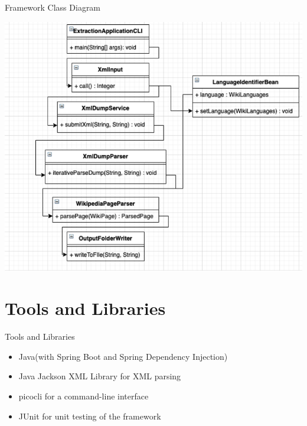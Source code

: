 \documentclass[czech,aspectratio=169]{beamer}
\begin{document}
	\begin{frame}{Framework Class Diagram}
		\begin{center}
			\includegraphics[width=0.55\paperwidth]{framework_diagram.png}
		\end{center}
	\end{frame}

    \section{Tools and Libraries}
    \begin{frame}{Tools and Libraries}
        \begin{itemize}
            \item Java(with Spring Boot and Spring Dependency Injection)
            \item Java Jackson XML Library for XML parsing
            \item picocli for a command-line interface
            \item JUnit for unit testing of the framework
        \end{itemize}
    \end{frame}
\end{document}
